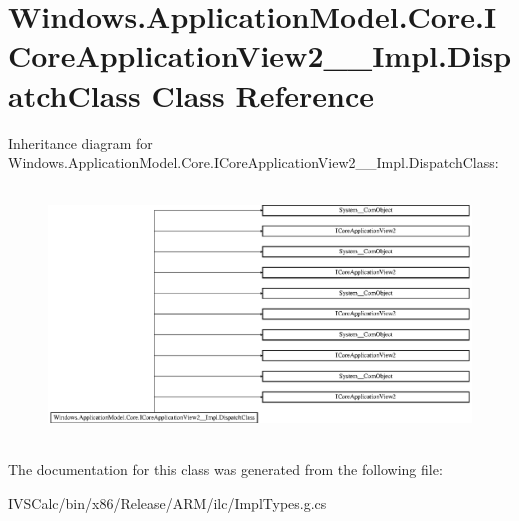 \hypertarget{class_windows_1_1_application_model_1_1_core_1_1_i_core_application_view2_____impl_1_1_dispatch_class}{}\section{Windows.\+Application\+Model.\+Core.\+I\+Core\+Application\+View2\+\_\+\+\_\+\+Impl.\+Dispatch\+Class Class Reference}
\label{class_windows_1_1_application_model_1_1_core_1_1_i_core_application_view2_____impl_1_1_dispatch_class}
Inheritance diagram for Windows.\+Application\+Model.\+Core.\+I\+Core\+Application\+View2\+\_\+\+\_\+\+Impl.\+Dispatch\+Class\+:\begin{figure}[H]
\begin{center}
\leavevmode
\includegraphics[height=6.739606cm]{class_windows_1_1_application_model_1_1_core_1_1_i_core_application_view2_____impl_1_1_dispatch_class}
\end{center}
\end{figure}


The documentation for this class was generated from the following file\+:\begin{DoxyCompactItemize}
\item 
I\+V\+S\+Calc/bin/x86/\+Release/\+A\+R\+M/ilc/Impl\+Types.\+g.\+cs\end{DoxyCompactItemize}
